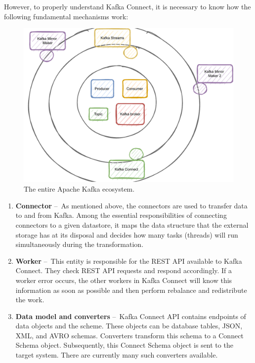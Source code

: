 However, to properly understand Kafka Connect, it is necessary to know how the following fundamental mechanisms work:

\begin{figure}[!ht]
    \centering
    \includegraphics[scale=0.8]{obrazky-figures/02-preliminaries/02-kafka/12-all-in-one}
    \caption{The entire Apache Kafka ecosystem.}
    \label{fig:02-ecosystem-of-kafka}
\end{figure}

\begin{enumerate}
    \item \textbf{Connector} \---\ As mentioned above, the connectors are used to transfer data to and from Kafka.
    Among the essential responsibilities of connecting connectors to a given datastore, it maps the data structure that the external storage has at its disposal and decides how many tasks (threads) will run simultaneously during the transformation.
    \item \textbf{Worker} \---\ This entity is responsible for the REST API available to Kafka Connect.
    They check REST API requests and respond accordingly.
    If a worker error occurs, the other workers in Kafka Connect will know this information as soon as possible and then perform rebalance and redistribute the work.
    \item \textbf{Data model and converters} \---\ Kafka Connect API contains endpoints of data objects and the scheme.
    These objects can be database tables, JSON, XML, and AVRO schemas.
    Converters transform this schema to a Connect Schema object.
    Subsequently, this Connect Schema object is sent to the target system.
    There are currently many such converters available.
\end{enumerate}

